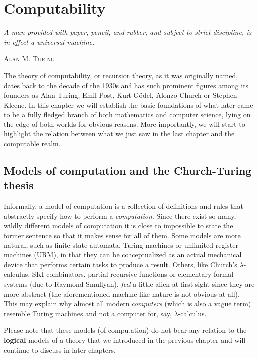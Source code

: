 \documentclass[../main.tex]{memoir}
\begin{document}
\chapter{Computability}

\epigraph{
  \textit{
    A man provided with paper, pencil, and rubber, and subject to strict discipline,
    is in effect a universal machine.
  }
}{\textsc{Alan M. Turing}}

The theory of computability, or recursion theory, as it was originally named, dates back to the decade of the 1930s and has such prominent figures among its founders as Alan Turing, Emil Post, Kurt Gödel, Alonzo Church or Stephen Kleene. In this chapter we will establish the basic foundations of what later came to be a fully fledged branch of both mathematics and computer science, lying on the edge of both worlds for obvious reasons. More importantly, we will start to highlight the relation between what we just saw in the last chapter and the computable realm. \\

\section{Models of computation and the Church-Turing thesis}

Informally, a model of computation is a collection of definitions and rules that abstractly specify how to perform a \textit{computation}. Since there exist so many, wildly different models of computation it is close to impossible to state the former sentence so that it makes sense for all of them. Some models are more natural, such as finite state automata, Turing machines or unlimited register machines (URM), in that they can be conceptualized as an actual mechanical device that performs certain tasks to produce a result. Others, like Church's $\lambda$-calculus, SKI combinators, partial recursive functions or elementary formal systems (due to Raymond Smullyan), \textit{feel} a little alien at first sight since they are more abstract (the aforementioned machine-like nature is not obvious at all). This may explain why almost all modern \textit{computers} (which is also a vague term) resemble Turing machines and not a computer for, say, $\lambda$-calculus. \\

\begin{remark}
  Please note that these models (of computation) do not bear any relation to the \textbf{logical} models of a theory that we introduced in the previous chapter and will continue to discuss in later chapters.
\end{remark}
\end{document}
